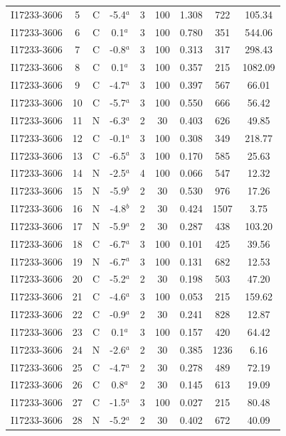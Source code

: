 \begin{table}
\begin{tabular}{ccccccccc}
I17233-3606 & 5 & C & -5.4$^{a}$ & 3 & 100 & 1.308 & 722 & 105.34 \\
I17233-3606 & 6 & C & 0.1$^{a}$ & 3 & 100 & 0.780 & 351 & 544.06 \\
I17233-3606 & 7 & C & -0.8$^{a}$ & 3 & 100 & 0.313 & 317 & 298.43 \\
I17233-3606 & 8 & C & 0.1$^{a}$ & 3 & 100 & 0.357 & 215 & 1082.09 \\
I17233-3606 & 9 & C & -4.7$^{a}$ & 3 & 100 & 0.397 & 567 & 66.01 \\
I17233-3606 & 10 & C & -5.7$^{a}$ & 3 & 100 & 0.550 & 666 & 56.42 \\
I17233-3606 & 11 & N & -6.3$^{a}$ & 2 & 30 & 0.403 & 626 & 49.85 \\
I17233-3606 & 12 & C & -0.1$^{a}$ & 3 & 100 & 0.308 & 349 & 218.77 \\
I17233-3606 & 13 & C & -6.5$^{a}$ & 3 & 100 & 0.170 & 585 & 25.63 \\
I17233-3606 & 14 & N & -2.5$^{a}$ & 4 & 100 & 0.066 & 547 & 12.32 \\
I17233-3606 & 15 & N & -5.9$^{b}$ & 2 & 30 & 0.530 & 976 & 17.26 \\
I17233-3606 & 16 & N & -4.8$^{b}$ & 2 & 30 & 0.424 & 1507 & 3.75 \\
I17233-3606 & 17 & N & -5.9$^{a}$ & 2 & 30 & 0.287 & 438 & 103.20 \\
I17233-3606 & 18 & C & -6.7$^{a}$ & 3 & 100 & 0.101 & 425 & 39.56 \\
I17233-3606 & 19 & N & -6.7$^{a}$ & 3 & 100 & 0.131 & 682 & 12.53 \\
I17233-3606 & 20 & C & -5.2$^{a}$ & 2 & 30 & 0.198 & 503 & 47.20 \\
I17233-3606 & 21 & C & -4.6$^{a}$ & 3 & 100 & 0.053 & 215 & 159.62 \\
I17233-3606 & 22 & C & -0.9$^{a}$ & 2 & 30 & 0.241 & 828 & 12.87 \\
I17233-3606 & 23 & C & 0.1$^{a}$ & 3 & 100 & 0.157 & 420 & 64.42 \\
I17233-3606 & 24 & N & -2.6$^{a}$ & 2 & 30 & 0.385 & 1236 & 6.16 \\
I17233-3606 & 25 & C & -4.7$^{a}$ & 2 & 30 & 0.278 & 489 & 72.19 \\
I17233-3606 & 26 & C & 0.8$^{a}$ & 2 & 30 & 0.145 & 613 & 19.09 \\
I17233-3606 & 27 & C & -1.5$^{a}$ & 3 & 100 & 0.027 & 215 & 80.48 \\
I17233-3606 & 28 & N & -5.2$^{a}$ & 2 & 30 & 0.402 & 672 & 40.09 \\

\end{tabular}
\end{table}
